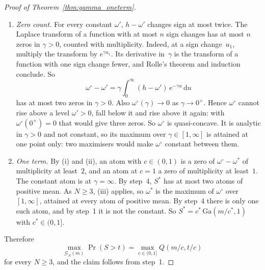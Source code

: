 \documentclass[11pt,a4paper]{article}
\theoremstyle{plain}
\theoremstyle{definition}
\theoremstyle{remark}
\begin{document}
\begin{proof}[Proof of Theorem~\ref{thm:gamma_oneterm}]
\begin{enumerate}
    is the value at the constant atom.
    $S^*$ is a constant plus a sum of independent Gamma variables, so its density is unimodal~\cite[Theorem~4, p.~11]{RoostaKhorasaniSzekely2015}, proved in~\cite[proof of Theorem~4, pp.~194--195]{SzekelyBakirov2003}; the constant shifts the mode only.
    Then $p(v) = f_{S^*}(t - v)$ for $v < t$ and $p(v) = 0$ for $v \ge t$ is unimodal on $[0, \infty)$, and so is its running average
    \begin{equation}
      h(u) = u^{-1}\int_0^u p:
    \end{equation}
    before the mode of~$p$, $p \ge h$; after it,
    \begin{equation}
      u\,(p(u) - h(u)) = u\,p(u) - \int_0^u p
    \end{equation}
    is non-increasing.
    Since $h' = (p - h)/u$, $h$ rises and then falls.
  \item \emph{Zero count.} For every constant $\omega'$, $h - \omega'$ changes sign at most twice.
    The Laplace transform of a function with at most $n$ sign changes has at most $n$ zeros in $\gamma > 0$, counted with multiplicity.
    Indeed, at a sign change~$u_1$, multiply the transform by $e^{\gamma u_1}$.
    Its derivative in~$\gamma$ is the transform of a function with one sign change fewer, and Rolle's theorem and induction conclude.
    So
    \begin{equation}
      \omega^\circ - \omega' = \gamma\int_0^\infty (h - \omega')\, e^{-\gamma u}\, \mathrm{d}u
    \end{equation}
    has at most two zeros in $\gamma > 0$.
    Also $\omega^\circ(\gamma) \to 0$ as $\gamma \to 0^+$.
    Hence $\omega^\circ$ cannot rise above a level $\omega' > 0$, fall below it and rise above it again: with $\omega^\circ(0^+) = 0$ that would give three zeros.
    So $\omega^\circ$ is quasi-concave.
    It is analytic in $\gamma > 0$ and not constant, so its maximum over $\gamma \in [1, \infty]$ is attained at one point only: two maximisers would make $\omega^\circ$ constant between them.
  \item \emph{One term.} By (i) and (ii), an atom with $c \in (0, 1)$ is a zero of $\omega^\circ - \omega^*$ of multiplicity at least~$2$, and an atom at $c = 1$ a zero of multiplicity at least~$1$.
    The constant atom is at $\gamma = \infty$.
    By step~4, $S^*$ has at most two atoms of positive mean.
    As $N \ge 3$, (iii) applies, so $\omega^*$ is the maximum of $\omega^\circ$ over $[1, \infty]$, attained at every atom of positive mean.
    By step~4 there is only one such atom, and by step~1 it is not the constant.
    So $S^* = c^*\,\mathrm{Ga}(m/c^*, 1)$ with $c^* \in (0, 1]$.
\end{enumerate}
Therefore
\begin{equation}
  \max_{\mathcal{G}_N(m)} \Pr(S > t) = \max_{c \in (0,1]} Q(m/c, t/c)
\end{equation}
for every $N \ge 3$, and the claim follows from step~1.
\end{proof}
\end{document}
